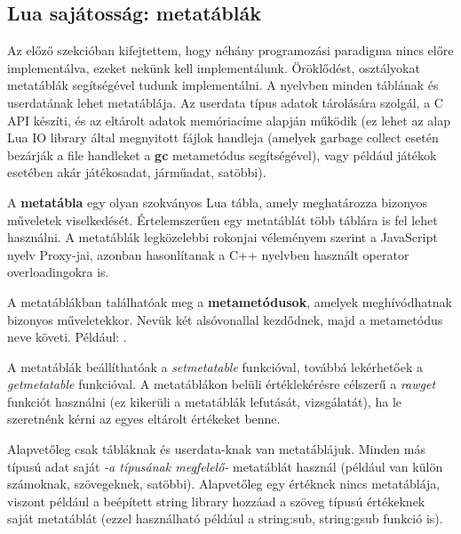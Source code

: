 \subsection{Lua sajátosság: metatáblák}
Az előző szekcióban kifejtettem, hogy néhány programozási paradigma nincs előre implementálva, ezeket nekünk kell implementálunk. Öröklődést, osztályokat metatáblák segítségével tudunk implementálni.
A nyelvben minden táblának és userdatának lehet metatáblája. Az userdata típus adatok tárolására szolgál, a C API készíti, és az eltárolt adatok memóriacíme alapján működik (ez lehet az alap Lua IO library által megnyitott fájlok handleja (amelyek garbage collect esetén bezárják a file handleket a \detokenize{__}\textbf{gc} metametódus segítségével), vagy például játékok esetében akár játékosadat, járműadat, satöbbi).

A \textbf{metatábla} egy olyan szokványos Lua tábla, amely meghatározza bizonyos műveletek viselkedését. Értelemszerűen egy metatáblát több táblára is fel lehet használni. A metatáblák legközelebbi rokonjai véleményem szerint a JavaScript nyelv Proxy-jai, azonban hasonlítanak a C++ nyelvben használt operator overloadingokra is. 

A metatáblákban találhatóak meg a \textbf{metametódusok}, amelyek meghívódhatnak bizonyos műveletekkor. Nevük két alsóvonallal kezdődnek, majd a metametódus neve követi. Például: \textit{}.

A metatáblák beállíthatóak a \textit{setmetatable} funkcióval, továbbá lekérhetőek a \textit{getmetatable} funkcióval. A metatáblákon belüli értéklekérésre célszerű a \textit{rawget} funkciót használni (ez kikerüli a metatáblák lefutását, vizsgálatát), ha le szeretnénk kérni az egyes eltárolt értékeket benne.

Alapvetőleg csak tábláknak és userdata-knak van metatáblájuk. Minden más típusú adat saját \textit{-a típusának megfelelő-} metatáblát használ (például van külön számoknak, szövegeknek, satöbbi). Alapvetőleg egy értéknek nincs metatáblája, viszont például a beépített string library hozzáad a szöveg típusú értékeknek saját metatáblát (ezzel használható például a string:sub, string:gsub funkció is).

